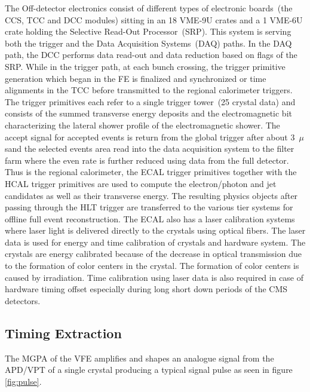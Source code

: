 The Off-detector electronics consist of different types of electronic boards~(the CCS, TCC and DCC modules) sitting in an 18 VME-9U crates and a 1 VME-6U crate holding the Selective Read-Out Processor~(SRP). This system is serving both the trigger and the  Data Acquisition Systems~(DAQ) paths. In the DAQ path, the DCC performs data read-out and data reduction based on flags of the SRP. While in the trigger path, at each bunch crossing, the trigger primitive generation which began in the FE is finalized and synchronized or time alignments in the TCC before transmitted to the regional calorimeter triggers. The trigger primitives each refer to a single trigger tower~(25 crystal data) and consists of  the summed transverse energy deposits and the electromagnetic bit characterizing the lateral shower profile of the electromagnetic shower. The accept signal for accepted events is return from the global trigger after about 3~$\mu$sand the selected events area read into the data acquisition system to the filter farm where the even rate is further reduced using data from the full detector. Thus is the regional calorimeter, the ECAL trigger primitives  together with the HCAL trigger primitives are used to  compute the electron/photon and jet candidates as well as their transverse energy. The resulting physics objects after passing through the HLT trigger are transferred to the various tier systems for offline full event reconstruction. The ECAL also has a laser calibration systems where laser light is delivered directly to the \pb crystals using optical fibers. The laser data is used for energy and time calibration of crystals and hardware system. The crystals are energy calibrated because of the decrease in optical transmission due to the formation of color centers in the crystal. The formation of color centers is caused by irradiation. Time calibration using laser data is also required in case of hardware timing offset especially during long short down periods of the CMS detectors.
\subsection{Timing Extraction}
The MGPA of the VFE amplifies and shapes an analogue signal from the APD/VPT of a single crystal producing a typical signal pulse as seen in figure \ref{fig:pulse}. 

